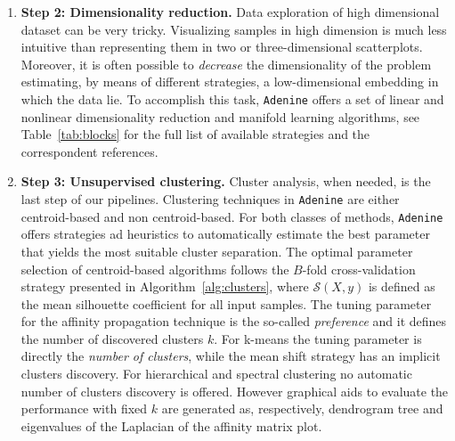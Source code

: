 \documentclass[twoside,11pt]{article}
\makeatletter
\newcommand{\ade}{\texttt{Adenine}\@\xspace}
\makeatother
\begin{document}
\begin{enumerate}
  \item[]{\bf Step 2: Dimensionality reduction.}
  Data exploration of high dimensional dataset can be very tricky. Visualizing samples in high dimension is much less intuitive than representing them in two or three-dimensional scatterplots. Moreover, it is often possible to \emph{decrease} the dimensionality of the problem estimating, by means of different strategies, a low-dimensional embedding in which the data lie. To accomplish this task, \ade offers a set of linear and nonlinear dimensionality reduction and manifold learning algorithms, see Table~\ref{tab:blocks} for the full list of available strategies and the correspondent references.

  \item[]{\bf Step 3: Unsupervised clustering.}
  Cluster analysis, when needed, is the last step of our pipelines. Clustering techniques in \ade are either centroid-based and non centroid-based. For both classes of methods, \ade offers strategies ad heuristics to automatically estimate the best parameter that yields the most suitable cluster separation. The optimal parameter selection of centroid-based algorithms follows the $B$-fold cross-validation strategy presented in Algorithm~\ref{alg:clusters}, where $\mathcal{S}(X,y)$ is defined as the mean silhouette coefficient \citep{rousseeuw1987silhouettes} for all input samples.
  The tuning parameter for the affinity propagation technique \citep{frey2007clustering} is the so-called \emph{preference} and it defines the number of discovered clusters $k$. For k-means \citep{bishop2006pattern} the tuning parameter is directly the \emph{number of clusters}, while the mean shift strategy \citep{comaniciu2002mean} has an implicit clusters discovery. For hierarchical \citep{friedman2001elements} and spectral clustering \citep{shi2000normalized} no automatic number of clusters discovery is offered. However graphical aids to evaluate the performance with fixed $k$ are generated as, respectively, dendrogram tree and eigenvalues of the Laplacian of the affinity matrix plot.
 

\end{enumerate}
\end{document}

